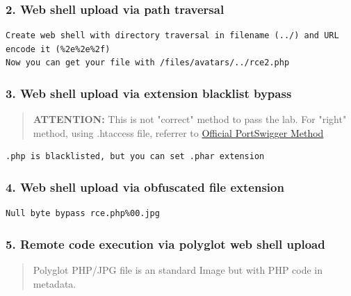 \documentclass[
  letterpaper,
]{article}
\begin{document}
\subsubsection{2. Web shell upload via path
traversal}\label{2-web-shell-upload-via-path-traversal}

\begin{Verbatim}[breaklines,breakanywhere,fontsize=\small]
Create web shell with directory traversal in filename (../) and URL encode it (%2e%2e%2f)
Now you can get your file with /files/avatars/../rce2.php
\end{Verbatim}

\subsubsection{3. Web shell upload via extension blacklist
bypass}\label{3-web-shell-upload-via-extension-blacklist-bypass}

\begin{quote}
\textbf{ATTENTION:} This is not "correct" method to pass the lab. For
"right" method, using .htaccess file, referrer to
\href{https://portswigger.net/web-security/file-upload/lab-file-upload-web-shell-upload-via-extension-blacklist-bypass}{Official
PortSwigger Method}
\end{quote}

\begin{Verbatim}[breaklines,breakanywhere,fontsize=\small]
.php is blacklisted, but you can set .phar extension
\end{Verbatim}

\subsubsection{4. Web shell upload via obfuscated file
extension}\label{4-web-shell-upload-via-obfuscated-file-extension}

\begin{Verbatim}[breaklines,breakanywhere,fontsize=\small]
Null byte bypass rce.php%00.jpg
\end{Verbatim}

\subsubsection{5. Remote code execution via polyglot web shell
upload}\label{5-remote-code-execution-via-polyglot-web-shell-upload}

\begin{quote}
Polyglot PHP/JPG file is an standard Image but with PHP code in
metadata.
\end{quote}
\end{document}

